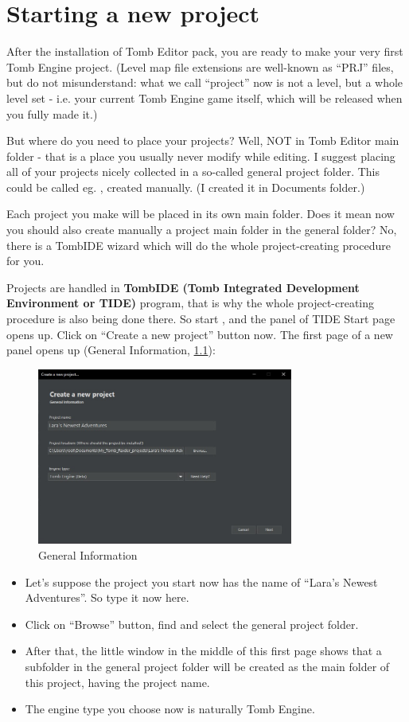 \chapter{Starting a new project}
After the installation of Tomb Editor pack, you are ready to make your very first Tomb Engine project. (Level map file extensions are well-known as “PRJ” files, but do not misunderstand: what we call “project” now is not a level, but a whole level set - i.e. your current Tomb Engine game itself, which will be released when you fully made it.)
\par But where do you need to place your projects? Well, NOT in Tomb Editor main folder - that is a place you usually never modify while editing. I suggest placing all of your projects nicely collected in a so-called general project folder. This could be called eg. , created manually. (I created it in Documents folder.)
\par Each project you make will be placed in its own main folder. Does it mean now you should also create manually a project main folder in the general folder? No, there is a TombIDE wizard which will do the whole project-creating procedure for you.
\par Projects are handled in \textbf{TombIDE (Tomb Integrated Development Environment or TIDE)} program, that is why the whole project-creating procedure is also being done there.
So start , and the panel of TIDE Start page opens up.
Click on “Create a new project” button now.
The first page of a new panel opens up (General Information, \ref{fig:tide1}):
\begin{figure}
    \centering
     \includegraphics[width=0.75\textwidth]{screenshots/1.jpg}
     \caption{General Information}
     \label{fig:tide1}
\end{figure}

\begin{itemize}
    \item Let's suppose the project you start now has the name of “Lara's Newest Adventures”. So type it now here.
    \item Click on “Browse” button, find and select the general project folder.
    \item After that, the little window in the middle of this first page shows that a subfolder in the general project folder will be created as the main folder of this project, having the project name.
    \item The engine type you choose now is naturally Tomb Engine.
\end{itemize}


